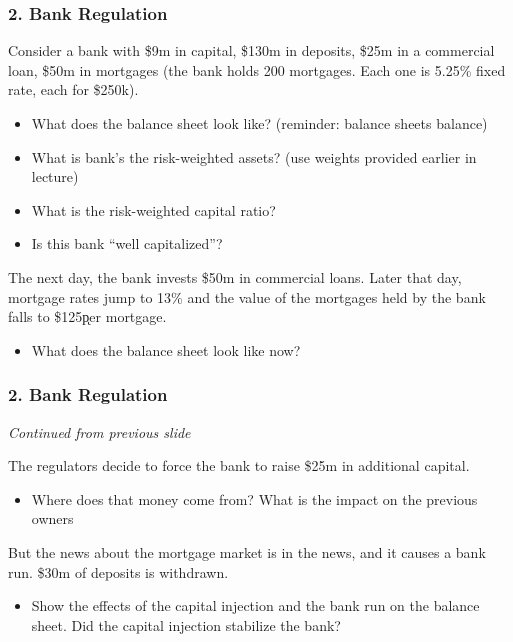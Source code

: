 \documentclass{beamer}
\begin{document}
\begin{practiceframe}[t]
\frametitle{2. Bank Regulation}

Consider a bank with \$9m in capital, \$130m in deposits, \$25m in a commercial loan, \$50m in mortgages (the bank holds 200 mortgages.  Each one is 5.25\% fixed rate, each for \$250k).  

    \begin{itemize}
        \item What does the balance sheet look like?  (reminder: balance sheets balance)
        \item What is bank’s the risk-weighted assets? (use weights provided earlier in lecture)
        \item What is the risk-weighted capital ratio?
        \item Is this bank “well capitalized”?
    \end{itemize}
    \vspace{1em}
    The next day, the bank invests \$50m in commercial loans.  Later that day, mortgage rates jump to 13\% and the value of the mortgages held by the bank falls to \$125\k per mortgage.
    
    \begin{itemize}
        \item What does the balance sheet look like now?
    \end{itemize}
    
\end{practiceframe}

\begin{practiceframe}[t]
\frametitle{2. Bank Regulation}

    \textit{Continued from previous slide}
    \vspace{1em}
    
    The regulators decide to force the bank to raise \$25m in additional capital.  
    
    \begin{itemize}
        \item Where does that money come from?   What is the impact on the previous owners
    \end{itemize}
    \vspace{1em}
    
     But the news about the mortgage market is in the news, and it causes a bank run.   \$30m of deposits is withdrawn.
    
    \begin{itemize}
        \item Show the effects of the capital injection and the bank run on the balance sheet.   Did the capital injection stabilize the bank?
    \end{itemize}

\end{practiceframe}
\end{document}
